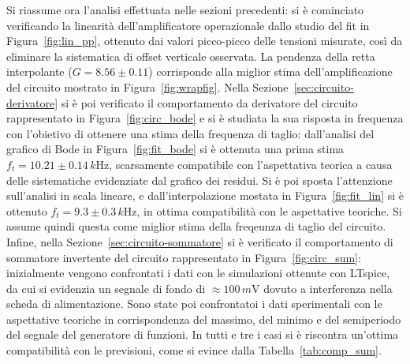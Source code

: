 \documentclass[a4paper,11pt]{article}
\begin{document}
Si riassume ora l'analisi effettuata nelle sezioni precedenti: si è cominciato verificando
la linearità dell'amplificatore operazionale dallo studio del fit in Figura~\ref{fig:lin_pp}, ottenuto
dai valori picco-picco delle tensioni misurate, così da eliminare la sistematica di offset
verticale osservata. La pendenza della retta interpolante ($G=8.56\pm 0.11$) corrisponde alla miglior
stima dell'amplificazione del circuito mostrato in Figura~\ref{fig:wrapfig}.
Nella Sezione~\ref{sec:circuito-derivatore} si è poi verificato il comportamento da derivatore
del circuito rappresentato in Figura~\ref{fig:circ_bode} e si è studiata la sua risposta in
frequenza con l'obietivo di ottenere una stima della frequenza
di taglio: dall'analisi del grafico di Bode in Figura~\ref{fig:fit_bode} si è ottenuta una
prima stima $f_{t}=10.21\pm 0.14 \,\si{k\Hz}$, scarsamente compatibile con l'aspettativa teorica a causa
delle sistematiche evidenziate dal grafico dei residui.
Si è poi sposta l'attenzione sull'analisi in scala lineare, e dall'interpolazione mostata in Figura~\ref{fig:fit_lin} si è ottenuto $f_{t}=9.3\pm 0.3 \,\si{k\Hz}$, in ottima compatibilità con le aspettative teoriche.
Si assume quindi questa come miglior stima della freqeunza di taglio del circuito.
Infine, nella Sezione~\ref{sec:circuito-sommatore} si è verificato il comportamento di sommatore invertente del circuito rappresentato in Figura~\ref{fig:circ_sum}: inizialmente vengono confrontati i dati con le simulazioni ottenute
con LTspice, da cui si evidenzia un segnale di fondo di $\approx 100 \,\si{m\volt}$ dovuto a
interferenza nella scheda di alimentazione. Sono state poi confrontatoi i dati sperimentali con le aspettative teoriche in corrispondenza del massimo, del minimo
e del semiperiodo del segnale del generatore di funzioni. In tutti e tre i casi si è riscontra
 un'ottima compatibilità con le previsioni, come si evince dalla Tabella~\ref{tab:comp_sum}.
\end{document}
